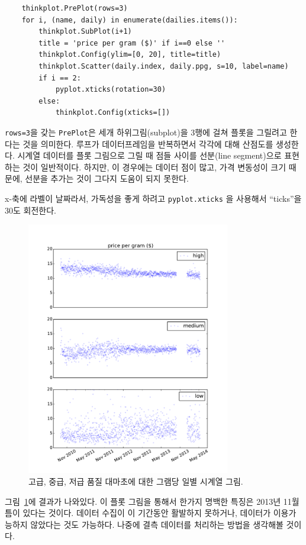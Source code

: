 \begin{verbatim}
    thinkplot.PrePlot(rows=3)
    for i, (name, daily) in enumerate(dailies.items()):
        thinkplot.SubPlot(i+1)
        title = 'price per gram ($)' if i==0 else ''
        thinkplot.Config(ylim=[0, 20], title=title)
        thinkplot.Scatter(daily.index, daily.ppg, s=10, label=name)
        if i == 2: 
            pyplot.xticks(rotation=30)
        else:
            thinkplot.Config(xticks=[])
\end{verbatim}

{\tt rows=3}을 갖는 {\tt PrePlot}은 세개 하위그림(subplot)을 3행에 걸쳐 플롯을 그릴려고 한다는 것을 의미한다.
루프가 데이터프레임을 반복하면서 각각에 대해 산점도를 생성한다.
시계열 데이터를 플롯 그림으로 그릴 때 점들 사이를 선분(line segment)으로 표현하는 것이 일반적이다. 하지만, 이 경우에는 데이터 점이 많고, 가격 변동성이 크기 때문에, 선분을 추가는 것이 그다지 도움이 되지 못한다.

x-축에 라벨이 날짜라서, 가독성을 좋게 하려고 {\tt pyplot.xticks} 을 사용해서 ``ticks''을 30도 회전한다.


\begin{figure}
\centerline{\includegraphics[width=3.5in]{figs/timeseries1.pdf}}
\caption{고급, 중급, 저급 품질 대마초에 대한 그램당 일별 시계열 그림.}
\label{timeseries1}
\end{figure}

그림~\ref{timeseries1}에 결과가 나와있다.
이 플롯 그림을 통해서 한가지 명백한 특징은 2013년 11월 틈이 있다는 것이다.
데이터 수집이 이 기간동안 활발하지 못하거나, 데이터가 이용가능하지 않았다는 것도 가능하다. 나중에 결측 데이터를 처리하는 방법을 생각해볼 것이다.

